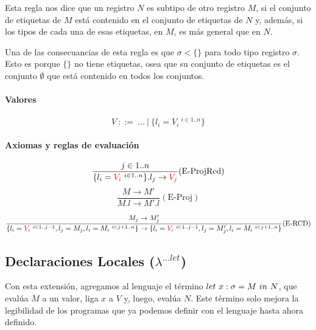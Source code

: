 \vspace*{5mm}
Esta regla nos dice que un registro $N$ es subtipo de otro registro $M$, si el conjunto de etiquetas de $M$ está contenido en el conjunto de etiquetas de $N$ y, además, si los tipos de cada una de esas etiquetas, en $M$, es más general que en $N$.

Una de las consecuancias de esta regla es que  $\sigma <\{\}$ para todo tipo registro $\sigma$. Esto es porque $\{\}$ no tiene etiquetas, osea que su conjunto de etiquetas es el conjunto $\emptyset$ que está contenido en todos los conjuntos.
\paragraph{Valores}
$$V~::=~\dots~|~\{l_i = V_i ~^{i\in 1..n}\}$$


\paragraph{Axiomas y reglas de evaluación}

\begin{equation*}
	\frac{j\in 1..n}{\{l_i = \color{red}V_i\color{black} ~^{i\in 1..n}\}.l_j \to \color{red}V_j\color{black}}(\text{E-ProjRcd})
\end{equation*}
\vspace*{5mm}
\begin{equation*}
	\frac{M \to M'}{M.l \to M'.l}(\text{E-Proj})
\end{equation*}

\vspace*{5mm}
\begin{equation*}
	\frac{M_j\to M_j'}{\{l_i = \color{red}V_i\color{black}~^{i\in 1..j-1}, l_j = M_j, l_i = M_i ~^{i\in j+1..n}\} \to \{l_i = \color{red}V_i\color{black}~^{i\in 1..j-1}, l_j = M'_j, l_i = M_i ~^{i\in j+1..n}\}}(\text{E-RCD})
\end{equation*}
\vspace*{5mm}
\subsection{Declaraciones Locales (\texorpdfstring{$\lambda^{...let}$}{lambda ...let})}\label{extension_lambda:let}

Con esta extensión, agregamos al lenguaje el término $let~x:\sigma = M~in~N$, que evalúa $M$ a un valor, liga $x$ a $V$ y, luego, evalúa $N$. Este término solo mejora la legibilidad de los programas que ya podemos definir con el lenguaje hasta ahora definido.

